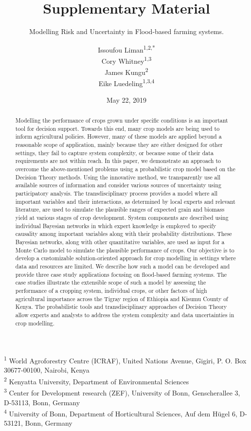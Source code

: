 \documentclass[12pt,oneside]{article}
\title{Supplementary Material}
\subtitle{Modelling Risk and Uncertainty in Flood-based farming systems.}
\author{Issoufou Liman\textsuperscript{1,2,*} \\ Cory Whitney\textsuperscript{1,3} \\ James Kungu\textsuperscript{2} \\ Eike Luedeling\textsuperscript{1,3,4}}
\date{May 22, 2019}
\begin{document}
\maketitle
\begin{abstract}
Modelling the performance of crops grown under specific conditions is an important tool for decision support. Towards this end, many crop models are being used to inform agricultural policies. However, many of these models are applied beyond a reasonable scope of application, mainly because they are either designed for other settings, they fail to capture system complexity, or because some of their data requirements are not within reach. In this paper, we demonstrate an approach to overcome the above-mentioned problems using a probabilistic crop model based on the Decision Theory methods. Using the innovative method, we transparently use all available sources of information and consider various sources of uncertainty using participatory analysis. The transdisciplinary process provides a model where all important variables and their interactions, as determined by local experts and relevant literature, are used to simulate the plausible ranges of expected grain and biomass yield at various stages of crop development. System components are described using individual Bayesian networks in which expert knowledge is employed to specify causality among important variables along with their probability distributions. These Bayesian networks, along with other quantitative variables, are used as input for a Monte Carlo model to simulate the plausible performance of crops. Our objective is to develop a customizable solution-oriented approach for crop modelling in settings where data and resources are limited. We describe how such a model can be developed and provide three case study applications focusing on flood-based farming systems. The case studies illustrate the extensible scope of such a model by assessing the performance of a cropping system, individual crops, or other factors of high agricultural importance across the Tigray region of Ethiopia and Kisumu County of Kenya. The probabilistic tools and transdisciplinary approaches of Decision Theory allow experts and analysts to address the system complexity and data uncertainties in crop modelling.
\end{abstract}

{
\hypersetup{linkcolor=black}
\setcounter{tocdepth}{5}
\tableofcontents
}
\textsuperscript{1} World Agroforestry Centre (ICRAF), United Nations Avenue, Gigiri, P. O. Box 30677-00100, Nairobi, Kenya\\
\textsuperscript{2} Kenyatta University, Department of Environmental Sciences\\
\textsuperscript{3} Center for Development research (ZEF), University of Bonn, Genscherallee 3, D-53113, Bonn, Germany\\
\textsuperscript{4} University of Bonn, Department of Horticultural Sciences, Auf dem Hügel 6, D-53121, Bonn, Germany
\end{document}
